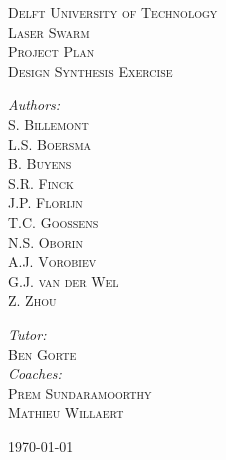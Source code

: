\begin{titlepage}
\begin{center}

\textsc{\LARGE Delft University of Technology}\\[1.5cm]

\textsc{\Huge Laser Swarm}\\[0.5cm]
\textsc{\small Project Plan}\\[1.5cm]
\textsc{\large Design Synthesis Exercise}\\[2.5cm]

\begin{minipage}{0.4\textwidth}
\begin{flushleft} \large
\emph{Authors:}\\
\textsc{S. Billemont\\
L.S. Boersma\\
B. Buyens\\
S.R. Finck\\
J.P. Florijn\\
T.C. Goossens\\
N.S. Oborin\\
A.J. Vorobiev\\
G.J. van der Wel\\
Z. Zhou\\}
\end{flushleft}
\end{minipage}
\begin{minipage}{0.4\textwidth}
\begin{flushright}
\emph{Tutor:}\\
\textsc{Ben Gorte}\\[1cm]
\emph{Coaches:}\\
\textsc{Prem Sundaramoorthy\\
Mathieu Willaert}
\end{flushright}
\end{minipage}
\vfill

\today
\end{center}
\end{titlepage}